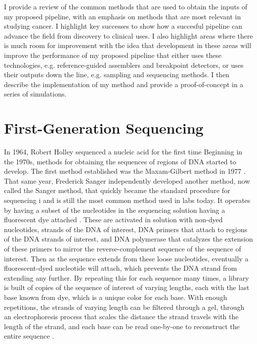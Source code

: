 \documentclass{easychithesis}
\begin{document}
I provide a review of the common methods that are used to obtain the inputs of my proposed pipeline, with an emphasis on methods that are most relevant in studying cancer. I highlight key successes to show how a succesful pipeline can advance the field from discovery to clinical uses. I also highlight areas where there is much room for improvement with the idea that development in these areas will improve the performance of my proposed pipeline that either uses these technologies, e.g. reference-guided assemblers and breakpoint detectors, or uses their outputs down the line, e.g. sampling and sequencing methods. I then describe the implementation of my method and provide a proof-of-concept in a series of simulations.

\section{First-Generation Sequencing}
In 1964, Robert Holley sequenced a nucleic acid for the first time Beginning in the 1970s, methods for obtaining the sequences of regions of DNA started to develop. The first method established was the Maxam-Gilbert method in 1977 \cite{maxam1977new, barba2014historical, history454}. That same year, Frederick Sanger independently developed another method, now called the Sanger method, that quickly became the standard procedure for sequencing i \cite{barba2014historical, sanger1977dna} and is still the most common method used in labs today. It operates by having a subset of the nucleotides in the sequencing solution having a fluorescent dye attached \cite{history454}. These are activated in solution with non-dyed nucleotides, strands of the DNA of interest, DNA primers that attach to regions of the DNA strands of interest, and DNA polymerase that catalyzes the extension of these primers to mirror the reverse-complement sequence of the sequence of interest. Then as the sequence extends from these loose nucleotides, eventually a fluorescent-dyed nucleotide will attach, which prevents the DNA strand from extending any further. By repeating this for each sequence many times, a library is built of copies of the sequence of interest of varying lengths, each with the last base known from dye, which is a unique color for each base. With enough repetitions, the strands of varying length can be filtered through a gel, through an electrophoresis process that scales the distance the strand travels with the length of the strand, and each base can be read one-by-one to reconstruct the entire sequence \cite{sanger1977dna}.
\end{document}
